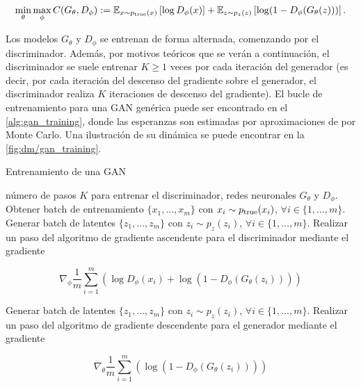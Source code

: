 \begin{equation}
    \label{eq:gan_objective}
    \min_\theta\max_\phi C(G_\theta, D_\phi) := \mathbb{E}_{x\sim p_{\operatorname{true}}(x)}\left[\log D_\phi(x)\right] + \mathbb{E}_{z\sim p_z(z)}\left[\log (1-D_\phi(G_\theta(z)))\right].
\end{equation}

Los modelos $G_\theta$ y $D_\phi$ se entrenan de forma alternada, comenzando por el discriminador. Además, por motivos teóricos que se verán a continuación, el discriminador se suele entrenar $K\geq 1$ veces por cada iteración del generador (es decir, por cada iteración del descenso del gradiente sobre el generador, el discriminador realiza $K$ iteraciones de descenso del gradiente). El bucle de entrenamiento para una GAN genérica puede ser encontrado en el \autoref{alg:gan_training}, donde las esperanzas son estimadas por aproximaciones de por Monte Carlo. Una ilustración de su dinámica se puede encontrar en la \autoref{fig:dm/gan_training}.

\begin{algorithm}
    \caption{Entrenamiento de una GAN}
    \label{alg:gan_training}
    \begin{algorithmic}[1]
        \Require número de pasos $K$ para entrenar el discriminador, redes neuronales $G_\theta$ y $D_\phi$.
        \State Obtener batch de entrenamiento $\{x_1,\ldots,x_m\}$ con $x_i\sim p_{\operatorname{true}}(x_i)$, $\forall i\in\{1,\ldots,m\}$.
        \State Generar batch de latentes $\{z_1,\ldots,z_m\}$ con $z_i\sim p_z(z_i)$, $\forall i\in\{1,\ldots,m\}$.
        \State Realizar un paso del algoritmo de gradiente ascendente para el discriminador mediante el gradiente

        \begin{equation*}
            \nabla_\phi \frac{1}{m}\sum_{i=1}^m \left(\log D_\phi(x_i) + \log(1-D_\phi(G_\theta(z_i)))\right)
        \end{equation*}

        \EndFor
        \State Generar batch de latentes $\{z_1,\ldots,z_m\}$ con $z_i\sim p_z(z_i)$, $\forall i\in\{1,\ldots,m\}$.
        \State Realizar un paso del algoritmo de gradiente descendente para el generador mediante el gradiente

        \begin{equation*}
            \nabla_\theta \frac{1}{m}\sum_{i=1}^m \left( \log(1-D_\phi(G_\theta(z_i)))\right)
        \end{equation*}

        \EndWhile
    \end{algorithmic}
\end{algorithm}

